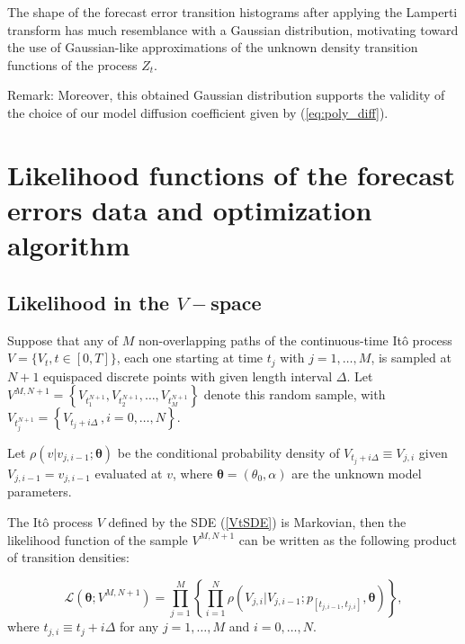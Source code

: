 \documentclass[11pt]{article}
\theoremstyle{definition}
\begin{document}
The shape of the forecast error transition histograms after applying the Lamperti transform has much resemblance with a Gaussian distribution, motivating toward the use of Gaussian-like approximations of the unknown density transition functions of the process $Z_t$.

{\color{red}Remark: Moreover, this obtained Gaussian distribution supports the validity of the choice of our model diffusion coefficient given by (\ref{eq:poly_diff}).}




\section{ Likelihood functions of the forecast errors data and optimization algorithm} \label{Section_5} 

\subsection{Likelihood in the $V-$space}

{\color{red}Suppose that any of $M$ non-overlapping paths of the continuous-time It\^{o} process $V = \{ V_t, t  \in [0,T] \}$, each one starting at time $t_j$ with $j = 1, \dots, M$, is sampled at $N + 1$ equispaced discrete points with given length interval $\Delta$. Let $ V^{M,N + 1}=\left\{ V_{t_1^{N + 1}} , V_{t_2^{N + 1}} ,\ldots , V_{t_M^{N + 1}} \right\}$ denote this random sample, with $V_{t_j^{N + 1}} =\left\{ V_{t_j + i \Delta}\,, i = 0, \ldots, N \right\}$.}

Let $\rho(v \vert v_{j, i-1} ; \bm{\theta})$ be the conditional probability density of $V_{t_j + i \Delta} \equiv V_{j, i}$ given $V_{j, i-1} = v_{j, i-1}$ evaluated at $v$, where $\bm{\theta} = (\theta_0, \alpha)$ are the unknown model parameters.

The It\^{o} process $V$ defined by the SDE (\ref{VtSDE}) is Markovian, then the likelihood function of the sample $ V^{M,N + 1}$ can be written as the following product of transition densities:  

\begin{equation}
\mathcal{L}\left(\bm{\theta}; V^{M,N +1}\right) = \prod\limits_{j=1}^M \left\{ \prod\limits_{i=1}^N \rho \left( {V_{j, i}| V_{j, i-1}} ; p_{[t_{j,  i-1}, t_{j , i} ]},  \bm{\theta} \right)    \right\},
\label{likelihood}
\end{equation}
where $t_{j ,i} \equiv  t_j + i \Delta$ for any $j = 1, \ldots, M$ and $i = 0, \ldots, N$. \\
\end{document}
